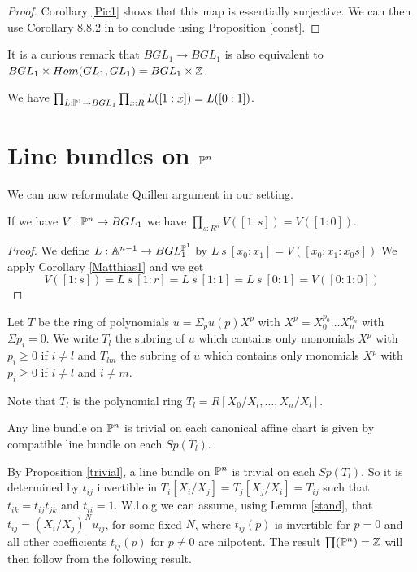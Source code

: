 \begin{proof}
  Corollary \ref{Pic1} shows that this map is essentially surjective.
  We can then use  Corollary 8.8.2 in \cite{HoTT} to conclude using Proposition \ref{const}.
\end{proof}

 It is a curious remark that $BGL_1\rightarrow BGL_1$ is also equivalent
 to $BGL_1\times Hom(GL_1,GL_1) = BGL_1\times\mathbb{Z}$.


\begin{corollary}\label{Matthias1}
  We have $\prod_{L:\mathbb{P}^1\rightarrow BGL_1}\prod_{x:R}L([1:x]) = L([0:1])$.
\end{corollary}

\section{Line bundles on $\mathbb{P}^n$}

We can now reformulate Quillen argument \cite{Quillen} in our setting.

\begin{proposition}\label{trivial}
  If we have $V:\mathbb{P}^n\rightarrow BGL_1$ we have ${\prod_{s:R^n}V([1:s]) = V([1:0])}$.
\end{proposition}

\begin{proof}
  We define $L:\mathbb{A}^{n-1}\rightarrow BGL_1^{\mathbb{P}^1}$ by $L~s~[x_0:x_1] = V([x_0:x_1:x_0s])$
  We apply Corollary \ref{Matthias1} and we get
  $$V([1:s]) = L~s~[1:r] = L~s~[1:1] = L~s~[0:1] = V([0:1:0])$$
\end{proof}

\medskip

Let $T$ be the ring of polynomials $u = \Sigma_p u(p)X^p$ with
$X^p = X_0^{p_0}\dots X_n^{p_n}$ with $\Sigma p_i = 0$. We write $T_l$ the subring
of $u$ which contains only monomials $X^p$ with $p_i\geqslant 0$ if $i\neq l$
and $T_{lm}$ the subring of $u$ 
which contains only monomials $X^p$ with $p_i\geqslant 0$ if $i\neq l$ and $i\neq m$.

Note that $T_l$ is the polynomial ring $T_l = R[X_0/X_l,\dots,X_n/X_l]$.

Any line bundle on $\mathbb{P}^n$ is trivial on each canonical affine chart is given by compatible line
bundle on each $Sp(T_l)$.

By Proposition \ref{trivial}, a line bundle on $\mathbb{P}^n$ is trivial on each $Sp(T_l)$.
So it is determined by $t_{ij}$ invertible in $T_i[X_i/X_j] = T_j[X_j/X_i] = T_{ij}$
such that $t_{ik} = t_{ij}t_{jk}$ and $t_{ii} = 1$. W.l.o.g we can assume, using Lemma \ref{stand}, that
$t_{ij} = (X_i/X_j)^N u_{ij}$, for some fixed $N$, where $t_{ij}(p)$ is invertible for $p = 0$
and all other coefficients $t_{ij}(p)$ for $p\neq 0$
are nilpotent. The result $\prod(\mathbb{P}^n) = \mathbb{Z}$ will then follow from the following result.

